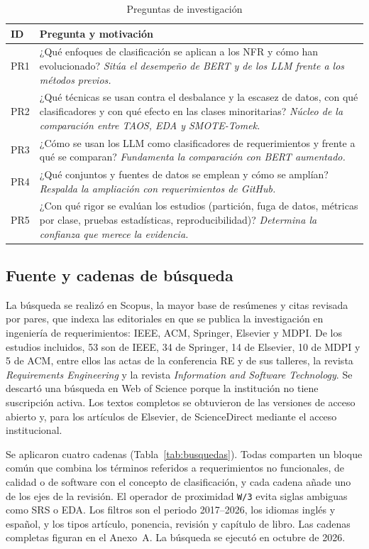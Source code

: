 \documentclass[conference]{IEEEtran}
\begin{document}
\begin{table}[!t]
\caption{Preguntas de investigación}
\label{tab:preguntas}
\centering\footnotesize
\begin{tabularx}{\columnwidth}{@{}p{0.6cm} Y@{}}
\toprule
\textbf{ID} & \textbf{Pregunta y motivación} \\
\midrule
PR1 & ¿Qué enfoques de clasificación se aplican a los NFR y cómo han evolucionado? \emph{Sitúa el desempeño de BERT y de los LLM frente a los métodos previos.} \\
PR2 & ¿Qué técnicas se usan contra el desbalance y la escasez de datos, con qué clasificadores y con qué efecto en las clases minoritarias? \emph{Núcleo de la comparación entre TAOS, EDA y SMOTE-Tomek.} \\
PR3 & ¿Cómo se usan los LLM como clasificadores de requerimientos y frente a qué se comparan? \emph{Fundamenta la comparación con BERT aumentado.} \\
PR4 & ¿Qué conjuntos y fuentes de datos se emplean y cómo se amplían? \emph{Respalda la ampliación con requerimientos de GitHub.} \\
PR5 & ¿Con qué rigor se evalúan los estudios (partición, fuga de datos, métricas por clase, pruebas estadísticas, reproducibilidad)? \emph{Determina la confianza que merece la evidencia.} \\
\bottomrule
\end{tabularx}
\end{table}

\subsection{Fuente y cadenas de búsqueda}
La búsqueda se realizó en Scopus, la mayor base de resúmenes y citas revisada por pares, que indexa las editoriales en que se publica la investigación en ingeniería de requerimientos: IEEE, ACM, Springer, Elsevier y MDPI. De los \nBuscados{} estudios incluidos, 53 son de IEEE, 34 de Springer, 14 de Elsevier, 10 de MDPI y 5 de ACM, entre ellos las actas de la conferencia RE y de sus talleres, la revista \emph{Requirements Engineering} y la revista \emph{Information and Software Technology}. Se descartó una búsqueda en Web of Science porque la institución no tiene suscripción activa. Los textos completos se obtuvieron de las versiones de acceso abierto y, para los artículos de Elsevier, de ScienceDirect mediante el acceso institucional.

Se aplicaron cuatro cadenas (Tabla~\ref{tab:busquedas}). Todas comparten un bloque común que combina los términos referidos a requerimientos no funcionales, de calidad o de software con el concepto de clasificación, y cada cadena añade uno de los ejes de la revisión. El operador de proximidad \texttt{W/3} evita siglas ambiguas como SRS o EDA. Los filtros son el periodo 2017--2026, los idiomas inglés y español, y los tipos artículo, ponencia, revisión y capítulo de libro. Las cadenas completas figuran en el Anexo~A. La búsqueda se ejecutó en octubre de 2026.
\end{document}
